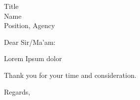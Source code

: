 \documentclass{letter}
\begin{document}
\begin{letter}{Title \\ Name \\ Position, Agency}
\opening{Dear Sir/Ma'am:}

Lorem Ipsum dolor


Thank you for your time and consideration.
\\
\closing{Regards,}





\end{letter}
\end{document}
